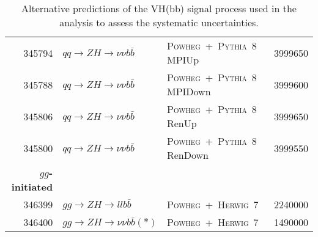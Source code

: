 \begin{table}[hb]
{\begin{tabular}{rllr}
      345794 & $qq\to ZH \to \nu\nu b\bar{b}$  & \textsc{Powheg}~+~\textsc{Pythia}~8  MPIUp & 3999650 \\
      345788 & $qq\to ZH \to \nu\nu b\bar{b}$  & \textsc{Powheg}~+~\textsc{Pythia}~8  MPIDown & 3999600 \\
      345806 & $qq\to ZH \to \nu\nu b\bar{b}$  & \textsc{Powheg}~+~\textsc{Pythia}~8  RenUp & 3999650 \\
      345800 & $qq\to ZH \to \nu\nu b\bar{b}$  & \textsc{Powheg}~+~\textsc{Pythia}~8  RenDown & 3999550 \\
      {\bfseries $gg$-initiated} & & & \\
      346399 & $gg\to ZH \to ll b\bar{b}$    & \textsc{Powheg}~+~\textsc{Herwig}~7   & 2240000 \\
      346400 & $gg\to ZH \to \nu\nu b\bar{b}(*) $  &  \textsc{Powheg}~+~\textsc{Herwig}~7   &  1490000 \\
      \bottomrule
    \end{tabular}
  }
  \caption[Alternative predictions of the VH(bb) signal process.]{Alternative
    predictions of the VH(bb) signal process used in the analysis to assess the
    systematic uncertainties.}
  \label{tab:VHSMsignals-alt}
\end{table}